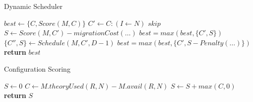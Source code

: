 
\begin{algorithm}[h]
\caption{Dynamic Scheduler}
\label{algo:sched}
\footnotesize
\begin{algorithmic}
    \State $best \gets \{C,Score(M,C)\}$%
        \State $C' \gets C : (I \gets N)$
            \State $skip$
        \EndIf
        \State $S \gets Score(M,C') - migrationCost(\dots)$
        \State $best = max(best,\{C',S\})$
        \State $\{C'',S\} \gets Schedule(M,C',D-1)$
        \State $best = max(best,\{C', S - Penalty(\dots)\})$
        \EndIf
    \EndFor
    \State \textbf{return} $best$
\EndProcedure
\end{algorithmic}
\normalsize
\end{algorithm}

\begin{algorithm}[h]
\caption{Configuration Scoring}
\label{algo:score}
\footnotesize
\begin{algorithmic}
    \State $S \gets 0$
        \State $C \gets M.theoryUsed(R,N) - M.avail(R,N)$
        \State $S \gets S + max(C,0)$
    \EndFor
    \State \textbf{return} $S$
\EndProcedure
\end{algorithmic}
\normalsize
\end{algorithm}
